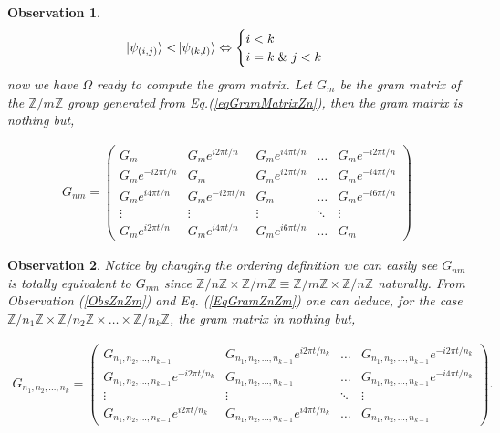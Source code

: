 \documentclass[12pt,letterpaper]{article}
\newtheorem{observation}{Observation}
\begin{document}
\begin{multicols}{2}
\begin{observation}
\begin{align}
\ket{\psi_{(i,j)}}<&\ket{\psi_{(k,l)}}\Leftrightarrow\begin{cases}i<k\\i=k\;\&\;j<k\end{cases}
\end{align}
now we have $\Omega$ ready to compute the gram matrix. Let $G_m$ be the gram matrix of the $\mathbb{Z}/m\mathbb{Z}$ group generated from Eq.(\ref{eqGramMatrixZn}), then the gram matrix is nothing but,
\end{observation}
\end{multicols}
\begin{align}\label{EqGramZnZm}
G_{nm}=\begin{pmatrix}
 G_m & G_me^{i2\pi t/n} & G_me^{i4\pi t/n} & \hdots &  G_me^{-i2\pi t/n} \\
  G_me^{-i2\pi t/n} & G_m & G_me^{i2\pi t/n} & \hdots & G_me^{-i4\pi t/n} \\
  G_me^{i4\pi t/n} &  G_me^{-i2\pi t/n}  & G_m & \hdots & G_me^{-i6\pi t/n}  \\
   \vdots & \vdots & \vdots & \ddots & \vdots \\
  G_me^{i2\pi t/n} &G_me^{i4\pi t/n}  & G_me^{i6\pi t/n}  & \hdots &  G_m 
\end{pmatrix}
\end{align}

\begin{multicols}{2}
\begin{observation}
Notice by changing the ordering definition we can easily see $G_{nm}$ is totally equivalent to $G_{mn}$ since $\mathbb{Z}/n\mathbb{Z}\times\mathbb{Z}/m\mathbb{Z}\equiv \mathbb{Z}/m\mathbb{Z}\times\mathbb{Z}/n\mathbb{Z}$ naturally. From Observation (\ref{ObsZnZm}) and Eq. (\ref{EqGramZnZm}) one can deduce, for the case $\mathbb{Z}/n_1\mathbb{Z}\times\mathbb{Z}/n_2\mathbb{Z}\times\dots\times \mathbb{Z}/n_k\mathbb{Z}$, the gram matrix in nothing but,
\end{observation}
\end{multicols}
\begin{align}
G_{n_1,n_2,...,n_k}=\begin{pmatrix}
 G_{n_1,n_2,...,n_{k-1}} & G_{n_1,n_2,...,n_{k-1}}e^{i2\pi t/n_k} & \hdots &  G_{n_1,n_2,...,n_{k-1}}e^{-i2\pi t/n_k} \\
  G_{n_1,n_2,...,n_{k-1}}e^{-i2\pi t/n_k} & G_{n_1,n_2,...,n_{k-1}} & \hdots & G_{n_1,n_2,...,n_{k-1}}e^{-i4\pi t/n_k} \\
   \vdots & \vdots  & \ddots & \vdots \\
  G_{n_1,n_2,...,n_{k-1}}e^{i2\pi t/n_k} & G_{n_1,n_2,...,n_{k-1}}e^{i4\pi t/n_k}  & \hdots &  G_{n_1,n_2,...,n_{k-1}} 
\end{pmatrix}.
\end{align}

\newpage



 
\end{document}
